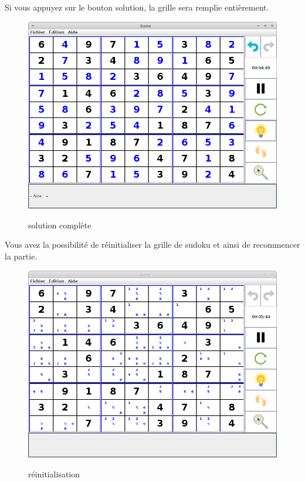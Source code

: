 \newpage
Si vous appuyez sur le bouton solution, la grille sera remplie entièrement.
\begin{figure}[ht]
  \caption{\label{annexe11} solution complète}
  \includegraphics [width=130mm]{images/solution.png} \\[0.5cm]
\end{figure}

\newpage
Vous avez la possibilité de réinitialiser la grille de sudoku 
et ainsi de recommencer la partie. 
\begin{figure}[ht]
  \caption{\label{annexe12} réinitialisation}
  \includegraphics [width=130mm]{images/reinit.png} \\[0.5cm]
\end{figure}

